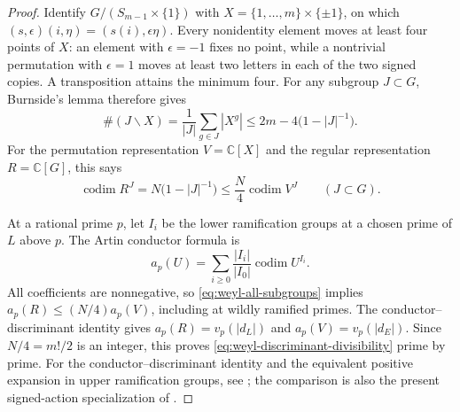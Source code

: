 \documentclass[11pt]{article}
\theoremstyle{definition}
\theoremstyle{remark}
\begin{document}
\begin{proof}
Identify $G/(S_{m-1}\times\{1\})$ with
$X=\{1,\ldots,m\}\times\{\pm1\}$, on which
$(s,\epsilon)(i,\eta)=(s(i),\epsilon\eta)$.
Every nonidentity element moves at least four points of $X$:
an element with $\epsilon=-1$ fixes no point, while a nontrivial
permutation with $\epsilon=1$ moves at least two letters in each
of the two signed copies.  A transposition attains the minimum four.
For any subgroup $J\subset G$, Burnside's lemma therefore gives
\[
 \#(J\backslash X)
 =\frac{1}{|J|}\sum_{g\in J}|X^g|
 \leq 2m-4\bigl(1-|J|^{-1}\bigr).
\]
For the permutation representation $V=\mathbb C[X]$ and the regular
representation $R=\mathbb C[G]$, this says
\begin{equation}
 \label{eq:weyl-all-subgroups}
 \operatorname{codim} R^J
 =N\bigl(1-|J|^{-1}\bigr)
 \leq\frac N4\operatorname{codim} V^J
 \qquad(J\subset G).
\end{equation}

At a rational prime $p$, let $I_i$ be the lower ramification groups
at a chosen prime of $L$ above $p$.  The Artin conductor formula is
\[
 a_p(U)=\sum_{i\geq0}\frac{|I_i|}{|I_0|}
                      \operatorname{codim}U^{I_i}.
\]
All coefficients are nonnegative, so
\eqref{eq:weyl-all-subgroups} implies
$a_p(R)\leq (N/4)a_p(V)$, including at wildly ramified primes.
The conductor--discriminant identity gives
$a_p(R)=v_p(|d_L|)$ and $a_p(V)=v_p(|d_E|)$.
Since $N/4=m!/2$ is an integer, this proves
\eqref{eq:weyl-discriminant-divisibility} prime by prime.
For the conductor--discriminant identity and the equivalent positive
expansion in upper ramification groups, see
\cite[\S3C, equations (3-5)--(3-7), pp.~614--615]{JonesRoberts14WO};
the comparison is also the present signed-action specialization of
\cite[Theorem~7.3, p.~634]{JonesRoberts14WO}.
\end{proof}
\end{document}
